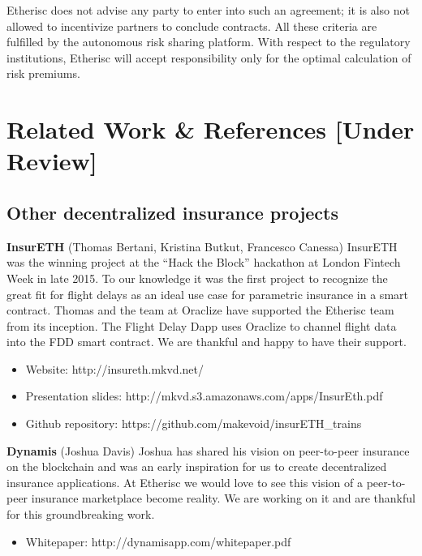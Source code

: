 \documentclass[12pt]{article}
\begin{document}
Etherisc does not advise any party to enter into such an agreement; it is also not allowed  to incentivize partners to conclude contracts. All these criteria are fulfilled by the autonomous risk sharing platform. With respect to the regulatory institutions, Etherisc will accept responsibility only for the optimal calculation of risk premiums.

\section{Related Work \& References [Under Review]}

\subsection{Other decentralized insurance projects}

\textbf{InsurETH} (Thomas Bertani, Kristina Butkut, Francesco Canessa) InsurETH was the winning project at the “Hack the Block” hackathon at London Fintech Week in late 2015. To our knowledge it was the first project to recognize the great fit for flight delays as an ideal use case for parametric insurance in a smart contract. Thomas and the team at Oraclize have supported the Etherisc team from its inception. The Flight Delay Dapp uses Oraclize to channel flight data into the FDD smart contract. We are thankful and happy to have their support.

\begin{itemize}
    \item Website: http://insureth.mkvd.net/
    \item Presentation slides: http://mkvd.s3.amazonaws.com/apps/InsurEth.pdf
    \item Github repository: https://github.com/makevoid/insurETH\_trains 
\end{itemize}


\textbf{Dynamis} (Joshua Davis) Joshua has shared his vision on peer-to-peer insurance on the blockchain and was an early inspiration for us to create decentralized insurance applications. At Etherisc we would love to see this vision of a peer-to-peer insurance marketplace become reality. We are working on it and are thankful for this groundbreaking work.

\begin{itemize}
    \item Whitepaper: http://dynamisapp.com/whitepaper.pdf
\end{itemize}
\end{document}

